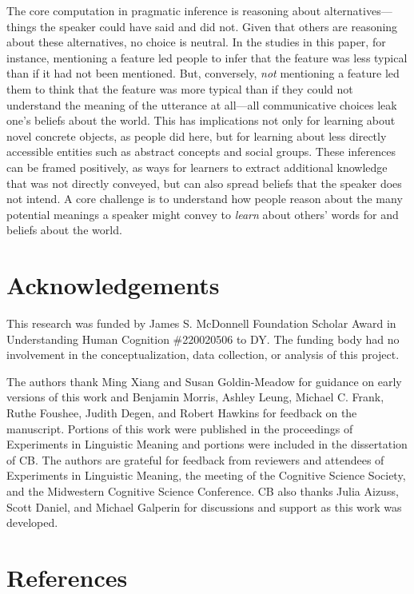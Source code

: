 \documentclass[
  english,
  man,floatsintext]{apa6}
\begin{document}
The core computation in pragmatic inference is reasoning about alternatives---things the speaker could have said and did not. Given that others are reasoning about these alternatives, no choice is neutral. In the studies in this paper, for instance, mentioning a feature led people to infer that the feature was less typical than if it had not been mentioned. But, conversely, \emph{not} mentioning a feature led them to think that the feature was more typical than if they could not understand the meaning of the utterance at all---all communicative choices leak one's beliefs about the world. This has implications not only for learning about novel concrete objects, as people did here, but for learning about less directly accessible entities such as abstract concepts and social groups. These inferences can be framed positively, as ways for learners to extract additional knowledge that was not directly conveyed, but can also spread beliefs that the speaker does not intend. A core challenge is to understand how people reason about the many potential meanings a speaker might convey to \emph{learn} about others' words for and beliefs about the world.

\hypertarget{acknowledgements}{%
\section{Acknowledgements}\label{acknowledgements}}

This research was funded by James S. McDonnell Foundation Scholar Award in Understanding Human Cognition \#220020506 to DY. The funding body had no involvement in the conceptualization, data collection, or analysis of this project.

The authors thank Ming Xiang and Susan Goldin-Meadow for guidance on early versions of this work and Benjamin Morris, Ashley Leung, Michael C. Frank, Ruthe Foushee, Judith Degen, and Robert Hawkins for feedback on the manuscript. Portions of this work were published in the proceedings of Experiments in Linguistic Meaning and portions were included in the dissertation of CB. The authors are grateful for feedback from reviewers and attendees of Experiments in Linguistic Meaning, the meeting of the Cognitive Science Society, and the Midwestern Cognitive Science Conference. CB also thanks Julia Aizuss, Scott Daniel, and Michael Galperin for discussions and support as this work was developed.

\newpage

\hypertarget{references}{%
\section{References}\label{references}}
\end{document}

